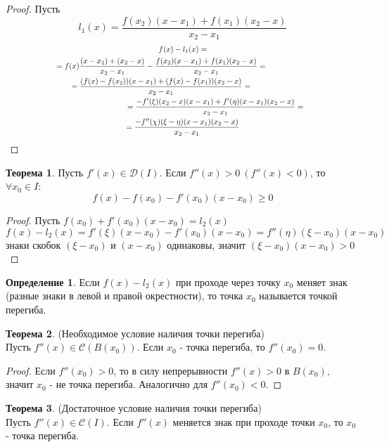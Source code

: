 \documentclass[a4paper, 12pt]{article}
\newcommand\tab[1][.5cm]{\hspace*{#1}}
\theoremstyle{definition}
\newtheorem*{definition}{Определение}
\newtheorem*{theorem}{Теорема}
\begin{document}
        \begin{proof}
            Пусть 
            \[l_1(x)=\frac{f(x_2)(x-x_1)+f(x_1)(x_2-x)}{x_2-x_1}\]
            \begin{multline*}
                f(x)-l_1(x)=\\
                =f(x)\frac{(x-x_1)+(x_2-x)}{x_2-x_1}-\frac{f(x_2)(x-x_1)+f(x_1)(x_2-x)}{x_2-x_1}=\tab[2cm]\\
                \tab[3cm]=\frac{(f(x)-f(x_2))(x-x_1)+(f(x)-f(x_1))(x_2-x)}{x_2-x_1}=\tab[5cm]\\
                \tab[3cm]=\frac{-f'(\xi)(x_2-x)(x-x_1)+f'(\eta)(x-x_1)(x_2-x)}{x_2-x_1}=\\=
                \frac{-f''(\chi)(\xi-\eta)(x-x_1)(x_2-x)}{x_2-x_1}
            \end{multline*}
        \end{proof} 
        \begin{theorem}
            Пусть $f'(x)\in \mathcal{D}(I)$. Если $f''(x)>0\ (f''(x)<0)$, то $\forall x_0\in I$:
            \[f(x)-f(x_0)-f'(x_0)(x-x_0)\geq 0\]
        \end{theorem} 
        \begin{proof}
            Пусть $f(x_0)+f'(x_0)(x-x_0)=l_2(x)$
            \[f(x)-l_2(x)=f'(\xi)(x-x_0)-f'(x_0)(x-x_0)=f''(\eta)(\xi-x_0)(x-x_0)\]
            знаки скобок $(\xi-x_0)$ и $(x-x_0)$ одинаковы, значит $(\xi-x_0)(x-x_0)>0$
        \end{proof} 
        \begin{definition}
            Если $f(x)-l_2(x)$ при проходе через точку $x_0$ меняет знак (разные знаки в левой и правой окрестности), то точка $x_0$ называется точкой перегиба.
        \end{definition}
        \begin{theorem} (Необходимое условие наличия точки перегиба)\\
            Пусть $f''(x)\in \mathcal{C}(B(x_0))$. Если $x_0$ - точка перегиба, то $f''(x_0)=0$.
        \end{theorem}  
        \begin{proof}
            Если $f''(x_0)>0$, то в силу непрерывности $f''(x)>0$ в $B(x_0)$, значит $x_0$ - не точка перегиба. Аналогично для $f''(x_0)<0$.
        \end{proof} 
        \begin{theorem} (Достаточное условие наличия точки перегиба)\\
            Пусть $f''(x)\in \mathcal{C}(I)$. Если $f''(x)$ меняется знак при проходе точки $x_0$, то $x_0$ - точка перегиба.
        \end{theorem} 
\end{document}
